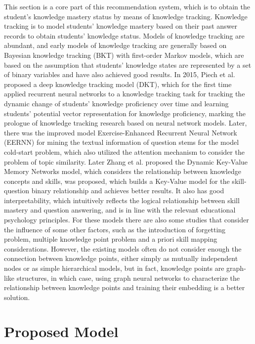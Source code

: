 This section is a core part of this recommendation system, which is to obtain the student's knowledge mastery status by means of knowledge tracking. Knowledge tracking is to model students' knowledge mastery based on their past answer records to obtain students' knowledge status. Models of knowledge tracking are abundant, and early models of knowledge tracking are generally based on Bayesian knowledge tracking (BKT) with first-order Markov models, which are based on the assumption that students' knowledge states are represented by a set of binary variables and have also achieved good results. In 2015, Piech et al.\cite{piech2015deep} proposed a deep knowledge tracking model (DKT), which for the first time applied recurrent neural networks to a knowledge tracking task for tracking the dynamic change of students' knowledge proficiency over time and learning students' potential vector representation for knowledge proficiency, marking the prologue of knowledge tracking research based on neural network models. Later, there was the improved model Exercise-Enhanced Recurrent Neural Network (EERNN)\cite{su2018exercise} for mining the textual information of question stems for the model cold-start problem, which also utilized the attention mechanism to consider the problem of topic similarity. Later Zhang et al. proposed the Dynamic Key-Value Memory Networks model\cite{zhang2017dynamic}, which considers the relationship between knowledge concepts and skills, was proposed, which builds a Key-Value model for the skill-question binary relationship and achieves better results. It also has good interpretability, which intuitively reflects the logical relationship between skill mastery and question answering, and is in line with the relevant educational psychology principles. For these models there are also some studies that consider the influence of some other factors, such as the introduction of forgetting problem, multiple knowledge point problem and a priori skill mapping considerations. However, the existing models often do not consider enough the connection between knowledge points, either simply as mutually independent nodes or as simple hierarchical models, but in fact, knowledge points are graph-like structures, in which case, using graph neural networks to characterize the relationship between knowledge points and training their embedding is a better solution.


\section{Proposed Model}

